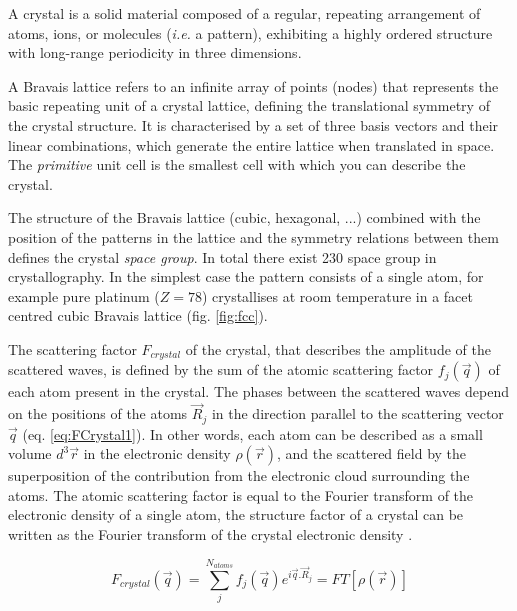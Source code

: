 A crystal is a solid material composed of a regular, repeating arrangement of atoms, ions, or molecules (\textit{i.e.} a pattern), exhibiting a highly ordered structure with long-range periodicity in three dimensions.

A Bravais lattice refers to an infinite array of points (nodes) that represents the basic repeating unit of a crystal lattice, defining the translational symmetry of the crystal structure.
It is characterised by a set of three basis vectors and their linear combinations, which generate the entire lattice when translated in space.
The \textit{primitive} unit cell is the smallest cell with which you can describe the crystal.

The structure of the Bravais lattice (cubic, hexagonal, ...) combined with the position of the patterns in the lattice and the symmetry relations between them defines the crystal \textit{space group}.
In total there exist 230 space group in crystallography.
In the simplest case the pattern consists of a single atom, for example pure platinum ($Z=78$) crystallises at room temperature in a facet centred cubic Bravais lattice (fig. \ref{fig:fcc}).

The scattering factor $F_{crystal}$ of the crystal, that describes the amplitude of the scattered waves, is defined by the sum of the atomic scattering factor $f_j(\vec{q})$ of each atom present in the crystal.
The phases between the scattered waves depend on the positions of the atoms $\vec{R}_j$ in the direction parallel to the scattering vector $\vec{q}$ (eq. \ref{eq:FCrystal1}).
In other words, each atom can be described as a small volume $d^3\vec{r}$ in the electronic density $\rho(\vec{r})$, and the scattered field by the superposition of the contribution from the electronic cloud surrounding the atoms.
The atomic scattering factor is equal to the Fourier transform of the electronic density of a single atom, the structure factor of a crystal can be written as the Fourier transform of the crystal electronic density \parencite{Paganin}.

\begin{equation}
    \label{eq:FCrystal1}
    F_{crystal}(\vec{q}) = \sum_j^{N_{atoms}} f_j(\vec{q}) e^{i\vec{q}.\vec{R}_j} = FT[\rho(\vec{r})]
\end{equation}

